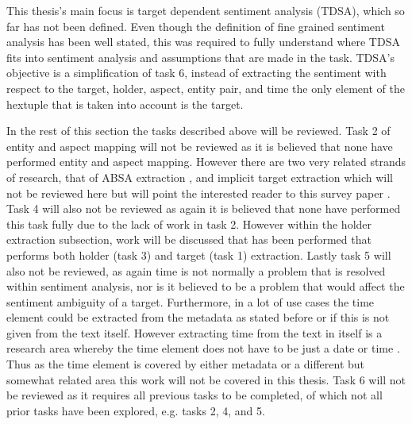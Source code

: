 This thesis's main focus is target dependent sentiment analysis (TDSA), which so far has not been defined. Even though the definition of fine grained sentiment analysis has been well stated, this was required to fully understand where TDSA fits into sentiment analysis and assumptions that are made in the task. TDSA's objective is a simplification of task 6, instead of extracting the sentiment with respect to the target, holder, aspect, entity pair, and time the only element of the hextuple that is taken into account is the target.

In the rest of this section the tasks described above will be reviewed. Task 2 of entity and aspect mapping will not be reviewed as it is believed that none have performed entity and aspect mapping. However there are two very related strands of research, that of ABSA extraction \citep{pontiki-etal-2016-semeval}, and implicit target extraction which will not be reviewed here but will point the interested reader to this survey paper \citep{ganganwar2019implicit}. Task 4 will also not be reviewed as again it is believed that none have performed this task fully due to the lack of work in task 2. However within the holder extraction subsection, work will be discussed that has been performed that performs both holder (task 3) and target (task 1) extraction. Lastly task 5 will also not be reviewed, as again time is not normally a problem that is resolved within sentiment analysis, nor is it believed to be a problem that would affect the sentiment ambiguity of a target. Furthermore, in a lot of use cases the time element could be extracted from the metadata as stated before or if this is not given from the text itself. However extracting time from the text in itself is a research area whereby the time element does not have to be just a date or time \citep{bethard-etal-2016-semeval, viani-etal-2018-time}. Thus as the time element is covered by either metadata or a different but somewhat related area this work will not be covered in this thesis. Task 6 will not be reviewed as it requires all previous tasks to be completed, of which not all prior tasks have been explored, e.g. tasks 2, 4, and 5.

